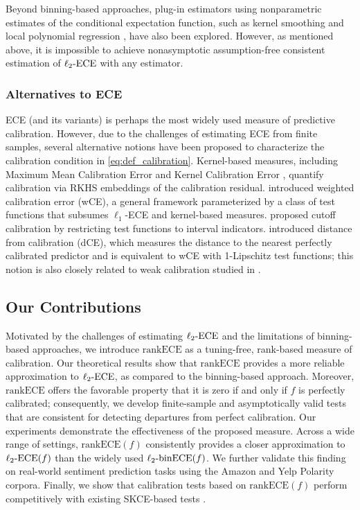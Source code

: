 \documentclass[11pt]{article}
\numberwithin{equation}{section}
\theoremstyle{definition}
\newcommand{\ECE}{\mathrm{ECE}}
\newcommand{\lECE}{\ell_2\textnormal{-}\ECE}
\newcommand{\binECE}{\mathrm{binECE}}
\newcommand{\lbinECE}{\ell_2\textnormal{-}\binECE}
\newcommand{\rankECE}{\mathrm{rankECE}}
\begin{document}
Beyond binning-based approaches, plug-in estimators using nonparametric estimates of the conditional expectation function, such as kernel smoothing \citep{zhang2020mix,blasiok2023smooth} and local polynomial regression \citep{austin2019integrated,cleveland2017local}, have also been explored. However, as mentioned above, it is impossible to achieve nonasymptotic assumption-free consistent estimation of $\lECE$ with any estimator. 



\subsubsection{Alternatives to ECE}

ECE (and its variants) is perhaps the most widely used measure of predictive calibration. However, due to the challenges of estimating ECE from finite samples, several alternative notions have been proposed to characterize the calibration condition in \eqref{eq:def_calibration}. Kernel-based measures, including Maximum Mean Calibration Error \citep{kumar2018trainable} and Kernel Calibration Error \citep{widmann2019calibration,widmann2021calibration}, quantify calibration via RKHS embeddings of the calibration residual. \citet{gopalan2022low} introduced weighted calibration error (wCE), a general framework parameterized by a class of test functions that subsumes $\ell_1$-ECE and kernel-based measures. \citet{rossellini2025can} proposed cutoff calibration by restricting test functions to interval indicators. \citet{blasiok2023unifying} introduced distance from calibration (dCE), which measures the distance to the nearest perfectly calibrated predictor and is equivalent to wCE with 1-Lipschitz test functions; this notion is also closely related to weak calibration studied in \citet{kakade2008deterministic}.


\subsection{Our Contributions}

Motivated by the challenges of estimating $\lECE$ and the limitations of binning-based approaches, we introduce $\rankECE$ as a tuning-free, rank-based measure of calibration. Our theoretical results show that $\rankECE$ provides a more reliable approximation to $\lECE$, as compared to the binning-based approach. Moreover, $\rankECE$ offers the favorable property that it is zero if and only if $f$ is perfectly calibrated; consequently, we develop finite-sample and asymptotically valid tests that are consistent for detecting departures from perfect calibration. 
Our experiments demonstrate the effectiveness of the proposed measure. Across a wide range of settings, $\rankECE(f)$ consistently provides a closer approximation to $\lECE(f)$ than the widely used $\lbinECE(f)$. We further validate this finding on real-world sentiment prediction tasks using the Amazon and Yelp Polarity corpora. Finally, we show that calibration tests based on $\rankECE(f)$ perform competitively with existing SKCE-based tests \citep{widmann2019calibration}.
\end{document}
